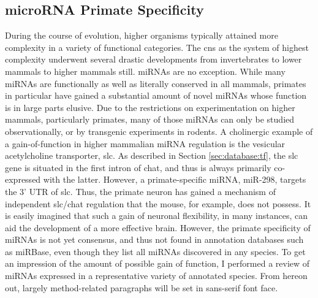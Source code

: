 \subsection{microRNA Primate Specificity}
During the course of evolution, higher organisms typically attained more complexity in a variety of functional categories. The \ac{cns} as the system of highest complexity underwent several drastic developments from invertebrates to lower mammals to higher mammals still. miRNAs are no exception. While many miRNAs are functionally as well as literally conserved in all mammals, primates in particular have gained a substantial amount of novel miRNAs whose function is in large parts elusive. Due to the restrictions on experimentation on higher mammals, particularly primates, many of those miRNAs can only be studied observationally, or by transgenic experiments in rodents. A cholinergic example of a gain-of-function in higher mammalian miRNA regulation is the vesicular acetylcholine transporter, \ac{slc}. As described in Section \ref{sec:database:tf}, the \ac{slc} gene is situated in the first intron of \ac{chat}, and thus is always primarily co-expressed with the latter. However, a primate-specific miRNA, miR-298, targets the 3' UTR of \ac{slc}.\cite{Soreq2015} Thus, the primate neuron has gained a mechanism of independent \ac{slc}/\ac{chat} regulation that the mouse, for example, does not possess. It is easily imagined that such a gain of neuronal flexibility, in many instances, can aid the development of a more effective brain. However, the primate specificity of miRNAs is not yet consensus, and thus not found in annotation databases such as miRBase, even though they list all miRNAs discovered in any species. To get an impression of the amount of possible gain of function, I performed a review of miRNAs expressed in a representative variety of annotated species. From hereon out, largely method-related paragraphs will be set in sans-serif font face.

